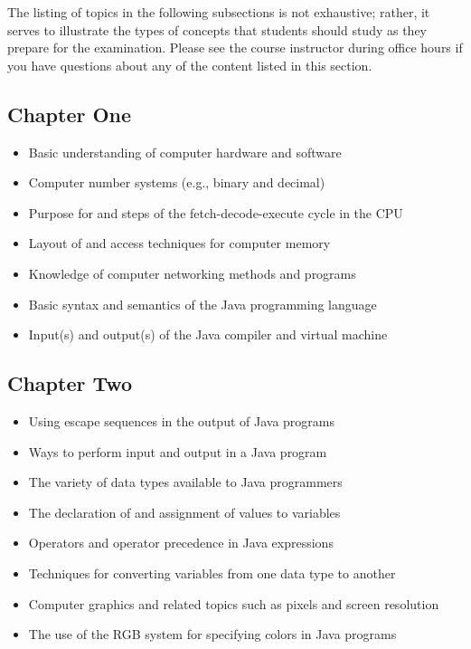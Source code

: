 The listing of topics in the following subsections is not exhaustive; rather, it serves to illustrate the types of
concepts that students should study as they prepare for the examination. Please see the course instructor during office
hours if you have questions about any of the content listed in this section.

\vspace*{-.1in}
\subsection*{Chapter One}

\begin{itemize}

  \itemsep 0in
  \item Basic understanding of computer hardware and software
  \item Computer number systems (e.g., binary and decimal)
  \item Purpose for and steps of the fetch-decode-execute cycle in the CPU
  \item Layout of and access techniques for computer memory
  \item Knowledge of computer networking methods and programs
  \item Basic syntax and semantics of the Java programming language
  \item Input(s) and output(s) of the Java compiler and virtual machine

  \end{itemize}

\vspace*{-.2in}
\subsection*{Chapter Two}

\begin{itemize}

  \itemsep 0in
  \item Using escape sequences in the output of Java programs
  \item Ways to perform input and output in a Java program
  \item The variety of data types available to Java programmers
  \item The declaration of and assignment of values to variables
  \item Operators and operator precedence in Java expressions
  \item Techniques for converting variables from one data type to another
  \item Computer graphics and related topics such as pixels and screen resolution
  \item The use of the RGB system for specifying colors in Java programs

  \end{itemize}



